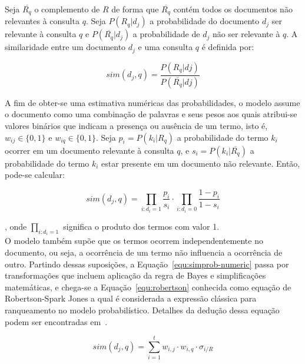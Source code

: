 Seja $\overline{R_q}$ o complemento de $R$ de forma que $\overline{R_q}$ contém todos os documentos não relevantes à consulta $q$. Seja $P(R_q|d_j)$ a probabilidade do documento $d_j$ ser relevante à consulta $q$ e $P(\overline{R_q}|d_j)$ a probabilidade de $d_j$ não ser relevante à $q$. A similaridade entre um documento $d_j$ e uma consulta $q$ é definida por:





\begin{equation}
	sim(d_j, q) = \frac{P(R_q|dj)}{P(\overline{R_q}|dj)} 
	\label{equ:simprob}
\end{equation}


A fim de obter-se uma estimativa numéricas das probabilidades, o modelo assume o documento como uma combinação de palavras e seus pesos aos quais atribui-se valores binários que indicam a presença ou ausência de um termo, isto é, $w_{ij} \in \{0,1\}$ e $w_{iq} \in \{0,1\}$. Seja $p_i = P(k_i|R_q)$ a probabilidade do termo $k_i$ ocorrer em um documento relevante à consulta $q$, e $s_i    = P(k_i|\overline{R_q})$ a probabilidade do termo $k_i$ estar presente em um documento não relevante. Então, pode-se calcular:

\begin{equation}
	sim(d_j, q) = 	
	\prod_{i:d_i=1} \frac{p_i}{s_i} 
	\cdot
	\prod_{i:d_i=0} \frac{1 - p_i}{1 - s_i}
	\label{equ:simprob-numeric}
\end{equation}

, onde $\prod_{i:d_i=1}$ significa o produto dos termos com valor 1.\\


%
%
O modelo também supõe que os termos ocorrem independentemente no documento, ou seja, a ocorrência de um termo não influencia a ocorrência de outro. 
Partindo dessas suposições, a Equação~\ref{equ:simprob-numeric} passa por transformações que incluem aplicação da regra de Bayes e simplificações matemáticas, e chega-se a Equação~\ref{equ:robertson} conhecida como equação de Robertson-Spark Jones a qual é considerada a expressão clássica para ranqueamento no modelo probabilístico. Detalhes da dedução dessa equação podem ser encontradas em~\cite{Croft2009, Manning2008, Rijsbergen1979}.



\begin{equation}
	sim(d_j,q) = \sum_{i=1}^{t} w_{i,j} \cdot w_{i,q}  \cdot \sigma_{i/R}
	\label{equ:robertson}
\end{equation}


